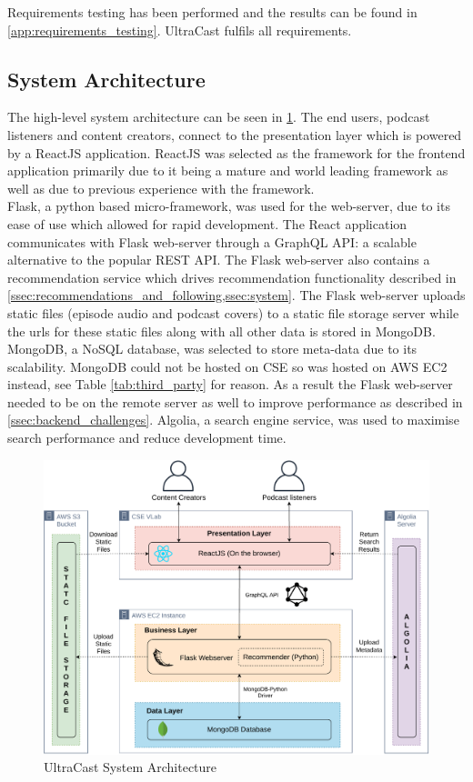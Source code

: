 \documentclass[../report.tex]{subfiles}
\begin{document}
Requirements testing has been performed and the results can be found in \cref{app:requirements_testing}.
UltraCast fulfils all requirements.

\newpage

\subsection{System Architecture}

The high-level system architecture can be seen in \cref{fig:system_architecture}.
The end users, podcast listeners and content creators, connect to the presentation layer 
which is powered by a ReactJS application. ReactJS was selected as the framework for the 
frontend application primarily due to it being a mature and world leading framework\cite{react} as well
as due to previous experience with the framework.\\

Flask, a python based micro-framework\cite{flask}, was used for the web-server, due to its ease of use which allowed
for rapid development. The React application communicates with Flask web-server through a GraphQL API: 
a scalable alternative to the popular REST API\cite{graphql}. The Flask web-server also contains a
recommendation service which drives recommendation functionality described in 
\cref{ssec:recommendations_and_following,ssec:system}. The Flask web-server uploads static files 
(episode audio and podcast covers) to a static file storage server while
the urls for these static files along with all other data is stored in MongoDB. MongoDB, a NoSQL database, 
was selected to store meta-data due to its scalability\cite{MongoDB2020}. MongoDB could not be hosted on
CSE so was hosted on AWS EC2 instead, see Table \ref{tab:third_party} for reason. As a result the Flask web-server
needed to be on the remote server as well to improve performance as described in \cref{ssec:backend_challenges}.
Algolia, a search engine service\cite{algolia}, was used to maximise search performance and reduce development time.

\begin{figure}[ht] 
    \centering
    \includegraphics[width=16cm]{resources/SystemArchitecture}
    \caption{UltraCast System Architecture}
    \label{fig:system_architecture} 
\end{figure}
\end{document}
